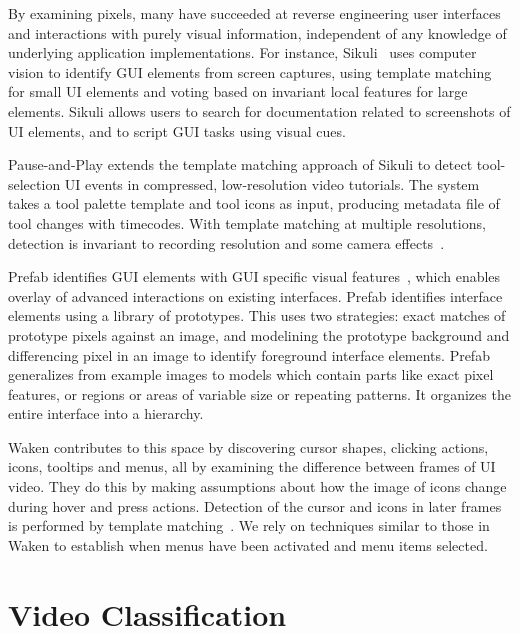 \documentclass[10pt]{article}
\begin{document}
By examining pixels, many have succeeded at reverse engineering user interfaces and interactions
with purely visual information, independent of any knowledge of underlying application
implementations. For instance, Sikuli~\cite{yeh_sikuli_2009} uses computer vision to identify GUI
elements from screen captures, using template matching for small UI elements and voting based on
invariant local features for large elements. Sikuli allows users to search for documentation related
to screenshots of UI elements, and to script GUI tasks using visual cues.

Pause-and-Play extends the template matching approach of Sikuli to detect tool-selection UI events
in compressed, low-resolution video tutorials.  The system takes a tool palette template and tool
icons as input, producing metadata file of tool changes with timecodes.  With template matching at
multiple resolutions, detection is invariant to recording resolution and some camera
effects~\cite{pongnumkul_pause-and-play_2011}.


Prefab identifies GUI elements with GUI specific visual features~\cite{dixon_prefab_2010}, which
enables overlay of advanced interactions on existing interfaces.  Prefab identifies interface
elements using a library of prototypes.  This uses two strategies: exact matches of prototype pixels
against an image, and modelining the prototype background and differencing pixel in an image to
identify foreground interface elements.  Prefab generalizes from example images to models which
contain parts like exact pixel features, or regions or areas of variable size or repeating patterns.
It organizes the entire interface into a hierarchy.

Waken contributes to this space by discovering cursor shapes, clicking actions, icons, tooltips and
menus, all by examining the difference between frames of UI video.  They do this by making
assumptions about how the image of icons change during hover and press actions.  Detection of the
cursor and icons in later frames is performed by template matching~\cite{banovic_waken_2012}.  We
rely on techniques similar to those in Waken to establish when menus have been activated and menu
items selected.


\section{Video Classification}\label{sec:daniel}
\end{document}
